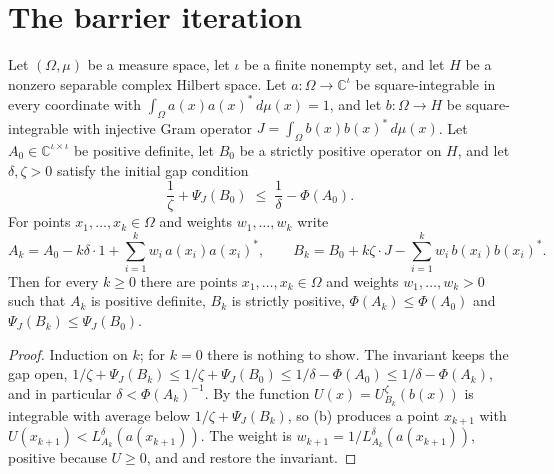 \section{The barrier iteration}

\begin{proposition}
\label{prop:barrier-iteration}
\leanok
{}
Let $(\Omega, \mu)$ be a measure space, let $\iota$ be a finite nonempty set, and let $H$
be a nonzero separable complex Hilbert space. Let $a : \Omega \to \mathbb{C}^{\iota}$ be
square-integrable in every coordinate with $\int_\Omega a(x) a(x)^* \, d\mu(x) = 1$, and
let $b : \Omega \to H$ be square-integrable with injective Gram operator
$J = \int_\Omega b(x) b(x)^* \, d\mu(x)$. Let $A_0 \in \mathbb{C}^{\iota \times \iota}$ be
positive definite, let $B_0$ be a strictly positive operator on $H$, and let
$\delta, \zeta > 0$ satisfy the initial gap condition
\[
  \frac{1}{\zeta} + \Psi_J(B_0) \; \leq \; \frac{1}{\delta} - \Phi(A_0).
\]
For points $x_1, \dots, x_k \in \Omega$ and weights $w_1, \dots, w_k$ write
\[
  A_k = A_0 - k \delta \cdot 1 + \sum_{i=1}^k w_i \, a(x_i) a(x_i)^*,
  \qquad
  B_k = B_0 + k \zeta \cdot J - \sum_{i=1}^k w_i \, b(x_i) b(x_i)^* .
\]
Then for every $k \geq 0$ there are points $x_1, \dots, x_k \in \Omega$ and weights
$w_1, \dots, w_k > 0$ such that $A_k$ is positive definite, $B_k$ is strictly positive,
$\Phi(A_k) \leq \Phi(A_0)$ and $\Psi_J(B_k) \leq \Psi_J(B_0)$.
\end{proposition}

\begin{proof}
\leanok
{}
Induction on $k$; for $k = 0$ there is nothing to show. The invariant keeps the gap open,
$1/\zeta + \Psi_J(B_k) \leq 1/\zeta + \Psi_J(B_0) \leq 1/\delta - \Phi(A_0)
\leq 1/\delta - \Phi(A_k)$, and in particular $\delta < \Phi(A_k)^{-1}$. By
 the function $U(x) = U_{B_k}^{\zeta}(b(x))$ is
integrable with average below $1/\zeta + \Psi_J(B_k)$, so
(b) produces a point $x_{k+1}$ with
$U(x_{k+1}) < L_{A_k}^{\delta}(a(x_{k+1}))$. The weight is
$w_{k+1} = 1 / L_{A_k}^{\delta}(a(x_{k+1}))$, positive because $U \geq 0$, and
 and  restore the invariant.
\end{proof}

